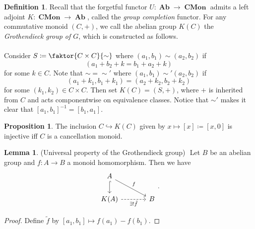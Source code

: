 \documentclass[10pt,letterpaper,cm]{nupset}
\theoremstyle{definition}
\newtheorem{definition}{Definition}
\theoremstyle{theorem}
\newtheorem{lemma}[theorem]{Lemma}
\newtheorem{prop}[theorem]{Proposition}
\theoremstyle{remark}
\newcommand{\1}{\mathbf{1}}
\newcommand{\0}{\vec 0}
\DeclareMathOperator{\Ab}{\mathbf{Ab}}
\DeclareMathOperator{\Cmon}{\mathbf{CMon}}
\begin{document}
\begin{abstract}
We begin low-dimensional $K$-theory, i.e., describe $K_0(-)$, $K_1(-)$, and $K_2(-)$, in various settings. The main sources for this talk are the following.
\begin{itemize}
\item \textit{nLab}.
\item Charles Weibel's \textit{The} K\textit{-book: an introduction to algebraic} K\textit{-theory}. Chapters I and II.
\item Eric M. Friedlander's \textit{An Introduction to} K\textit{-theory}, Chapter 1.
\end{itemize}
\end{abstract}

\begin{definition}
Recall that the forgetful functor $U: \Ab \to \Cmon$ admits a left adjoint $K: \Cmon \to \Ab$, called the \textit{group completion} functor. For any commutative monoid $(C, +)$, we call the abelian group $K(C)$ the \textit{Grothendieck group of $G$}, which is constructed as follows.
\\ \\ Consider $S\coloneqq \faktor{C \times C}{\sim}$ where $(a_1, b_1) \sim (a_2, b_2)$ if $$(a_1 + b_2 +k = b_1 + a_2 +k)$$ for some $k\in C$. Note that $\sim = \sim'$ where $(a_1, b_1) \sim' (a_2, b_2)$ if $$(a_1 + k_1, b_1 + k_1) = (a_2 +k_2, b_2 + k_2)$$ for some $(k_1, k_2) \in C\times C$. Then set $K(C) = (S, +)$, where $+$ is inherited from $C$ and acts componentwise on equivalence classes. Notice that $\sim'$ makes it clear that $[a_1, b_1]^{-1} = [b_1, a_1]$.
\end{definition}

\begin{prop}
The inclusion $C \hookrightarrow K(C)$ given by $x \mapsto [x]\coloneqq[x, 0]$ is injective iff $C$ is a cancellation monoid.
\end{prop}

\begin{lemma}{(Universal property of the Grothendieck group)} $ $
Let $B$ be an abelian group and $f: A \to B$ a monoid homomorphism. Then we have 
\[
\begin{tikzcd}[column sep=large]
A \arrow[rd, "f"] \arrow[d, hook] &  \\
K(A) \arrow[swap, r, "\exists! \tilde{f}", dashed] & B
\end{tikzcd}.
\]
\end{lemma}
\begin{proof}
Define $\tilde{f}$ by $[a_1, b_1]\mapsto f(a_1) - f(b_1)$.
\end{proof}
\end{document}
